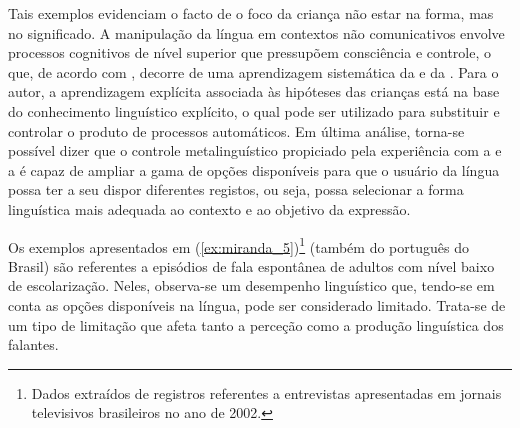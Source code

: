 \documentclass[output=paper]{LSP/langsci}
\begin{document}
Tais exemplos evidenciam o facto de o foco da criança não estar na forma, mas no significado. A manipulação da língua em contextos não comunicativos envolve processos cognitivos de nível superior que pressupõem consciência e controle, o que, de acordo com \citet{gombert2003}, decorre de uma aprendizagem sistemática da  e da . Para o autor, a aprendizagem explícita associada às hipóteses das crianças está na base do conhecimento linguístico explícito, o qual pode ser utilizado para substituir e controlar o produto de processos automáticos. Em última análise, torna-se possível dizer que o controle metalinguístico propiciado pela experiência com a  e a  é capaz de ampliar a gama de opções disponíveis para que o usuário da língua possa ter a seu dispor diferentes registos, ou seja, possa selecionar a forma linguística mais adequada ao contexto e ao objetivo da expressão.\newpage

Os exemplos apresentados em (\ref{ex:miranda_5})\footnote{Dados extraídos de registros referentes a entrevistas apresentadas em jornais televisivos brasileiros no ano de 2002.} (também do português do Brasil) são referentes a episódios de fala espontânea de adultos com nível baixo de escolarização. Neles, observa-se um desempenho linguístico que, tendo-se em conta as opções disponíveis na língua, pode ser considerado limitado. Trata-se de um tipo de limitação que afeta tanto a perceção como a produção linguística dos falantes.

\ea\label{ex:miranda_5}
\z
\z
\end{document}
